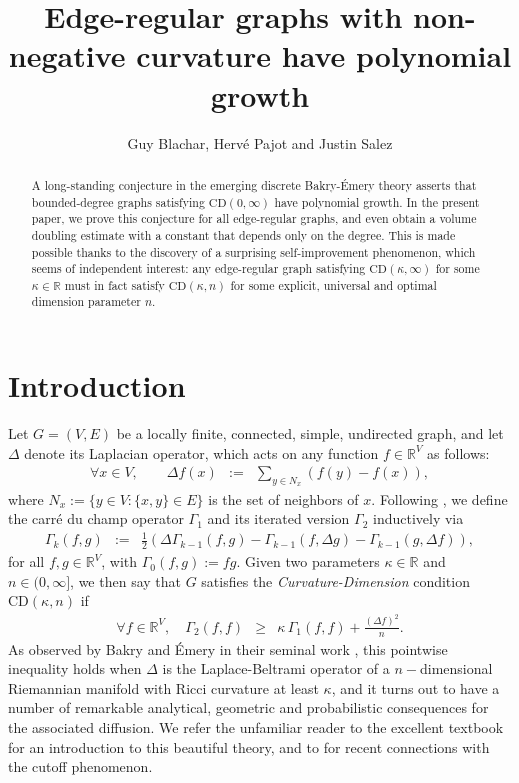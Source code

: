 \documentclass[12pt,final]{article}
\title{Edge-regular graphs with non-negative curvature have  polynomial growth}
\author{Guy Blachar, Hervé Pajot and Justin Salez}
\newcommand{\dR}{\mathbb {R}}
\newcommand{\CD}{\mathrm{CD}}
\begin{document}
\maketitle
\begin{abstract}
A long-standing conjecture in the emerging discrete Bakry-\'Emery theory  asserts that bounded-degree graphs satisfying $\CD(0,\infty)$ have polynomial growth. In the present paper, we prove this conjecture for all edge-regular graphs, and even obtain a volume doubling estimate with a constant that depends only on the degree. This is made possible thanks to the discovery of a surprising self-improvement phenomenon, which seems of independent interest: any edge-regular graph satisfying $\CD(\kappa,\infty)$ for some $\kappa\in\dR$  must in fact satisfy $\CD(\kappa,n)$ for some explicit, universal and optimal dimension parameter $n$. 
\end{abstract}

\section{Introduction}
Let  $G=(V,E)$ be a locally finite, connected, simple, undirected  graph, and let $\Delta$ denote its Laplacian operator, which  acts on any function $f\in\dR^V$ as follows:
\begin{eqnarray}
\label{def:Delta}
\forall x\in V,\qquad \Delta f(x) & := & \sum_{y\in N_x}\left(f(y)-f(x)\right),
\end{eqnarray}
where $N_x:=\{y\in V\colon\{x,y\}\in E\}$ is the set of neighbors of $x$. Following \cite{MR889476,MR1665591,MR2644381}, we define the carré du champ operator $\Gamma_1$ and its iterated version $\Gamma_2$ inductively via
\begin{eqnarray}
\Gamma_{k}(f,g) & := & \frac{1}{2}\left(\Delta \Gamma_{k-1}(f,g)-\Gamma_{k-1}(f,\Delta g)-\Gamma_{k-1}(g,\Delta f)\right),
\end{eqnarray} 
for all $f,g\in\dR^V$, with $\Gamma_0(f,g):=fg$. Given two parameters $\kappa\in\dR$ and $n\in(0,\infty]$, we then say that  $G$ satisfies the \emph{Curvature-Dimension} condition $\CD(\kappa,n)$ if 
\begin{eqnarray}
\label{def:CD}
\forall f\in\dR^V,\quad 
\Gamma_2(f,f) & \ge & \kappa\, \Gamma_1(f,f) + \frac{(\Delta f)^2}{n}.
\end{eqnarray}As observed by Bakry and \'Emery in their seminal work \cite{MR889476}, this pointwise inequality holds when  $\Delta$ is the Laplace-Beltrami operator of a $n-$dimensional Riemannian manifold  with Ricci curvature at least $\kappa$, and it turns out to have a number of remarkable analytical, geometric and probabilistic consequences for the associated diffusion. We refer the unfamiliar reader to the excellent textbook \cite{MR3155209} for an introduction to this beautiful theory, and to  \cite{salez2025modernaspectsmarkovchains,Salez2026Cutoff,pedrotti2025newcutoffcriterionnonnegatively} for recent connections with the cutoff phenomenon. 
\end{document}
